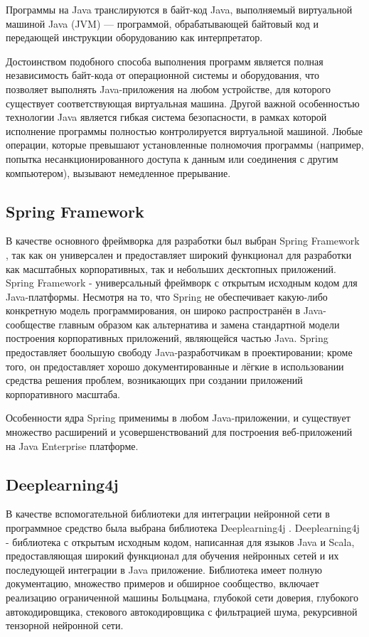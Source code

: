 Программы на Java транслируются в байт-код Java, выполняемый виртуальной машиной Java (JVM) — программой, обрабатывающей байтовый код и передающей инструкции оборудованию как интерпретатор.

Достоинством подобного способа выполнения программ является полная независимость байт-кода от операционной системы и оборудования, что позволяет выполнять Java-приложения на любом устройстве, для которого существует соответствующая виртуальная машина.
Другой важной особенностью технологии Java является гибкая система безопасности, в рамках которой исполнение программы полностью контролируется виртуальной машиной.
Любые операции, которые превышают установленные полномочия программы (например, попытка несанкционированного доступа к данным или соединения с другим компьютером), вызывают немедленное прерывание.

\subsection{Spring Framework}

В качестве основного фреймворка для разработки был выбран Spring Framework \cite{spring-book}, так как он универсален и предоставляет широкий функционал для разработки как масштабных корпоративных, так и небольших десктопных приложений.
Spring Framework - универсальный фреймворк с открытым исходным кодом для Java-платформы.
Несмотря на то, что Spring не обеспечивает какую-либо конкретную модель программирования, он широко распространён в Java-сообществе главным образом как альтернатива и замена стандартной модели построения корпоративных приложений, являющейся частью Java.
Spring предоставляет боольшую свободу Java-разработчикам в проектировании; кроме того, он предоставляет хорошо документированные и лёгкие в использовании средства решения проблем, возникающих при создании приложений корпоративного масштаба.

Особенности ядра Spring применимы в любом Java-приложении, и существует множество расширений и усовершенствований для построения веб-приложений на Java Enterprise платформе.

\subsection{Deeplearning4j}

В качестве вспомогательной библиотеки для интеграции нейронной сети в программное средство была выбрана библиотека Deeplearning4j \cite{deeplearning4j-book}.
Deeplearning4j - библиотека с открытым исходным кодом, написанная для языков Java и Scala, предоставляющая широкий функционал для обучения нейронных сетей и их последующей интеграции в Java приложение.
Библиотека имеет полную документацию, множество примеров и обширное сообщество, включает реализацию ограниченной машины Больцмана, глубокой сети доверия, глубокого автокодировщика, стекового автокодировщика с фильтрацией шума, рекурсивной тензорной нейронной сети.

\clearpage